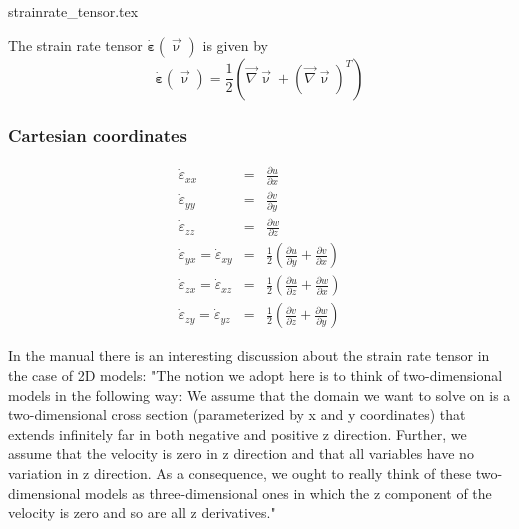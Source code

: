 \begin{flushright} {\tiny {\color{gray} strainrate\_tensor.tex}} \end{flushright}


The strain rate tensor $\dot{\bm\varepsilon}(\vec\upnu)$ is given by
\begin{equation}
\dot{\bm \varepsilon}({\vec \upnu}) = \frac{1}{2}( {\vec \nabla}{\vec \upnu}+ ({\vec \nabla}{\vec \upnu})^T) 
\end{equation}

\subsubsection{Cartesian coordinates}
\begin{eqnarray}
\dot\varepsilon_{xx} &=& \frac{\partial u}{\partial x} \\
\dot\varepsilon_{yy} &=& \frac{\partial v}{\partial y} \\
\dot\varepsilon_{zz} &=& \frac{\partial w}{\partial z} \\
\dot\varepsilon_{yx} =
\dot\varepsilon_{xy} &=& \frac{1}{2} \left( \frac{\partial u}{\partial y} + \frac{\partial v}{\partial x}  \right)\\
\dot\varepsilon_{zx} =
\dot\varepsilon_{xz} &=& \frac{1}{2} \left( \frac{\partial u}{\partial z} + \frac{\partial w}{\partial x}  \right)\\
\dot\varepsilon_{zy} =
\dot\varepsilon_{yz} &=& \frac{1}{2} \left( \frac{\partial v}{\partial z} + \frac{\partial w}{\partial y}  \right)
\end{eqnarray}

In the \aspect manual there is an interesting discussion about the strain rate tensor in the case of 
2D models: "The notion we adopt here is to think of two-dimensional models in the following way: 
We assume that the domain we want to solve on is a two-dimensional
cross section (parameterized by x and y coordinates) that extends infinitely far in both negative and positive
z direction. Further, we assume that the velocity is zero in z direction and that all variables have no
variation in z direction. As a consequence, we ought to really think of these two-dimensional models as
three-dimensional ones in which the z component of the velocity is zero and so are all z derivatives."

